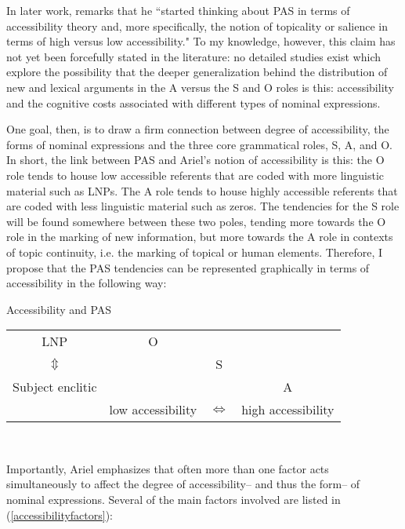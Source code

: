 In later work, \citet[194]{dubois2006} remarks that he ``started thinking about PAS in terms of accessibility theory and, more specifically, the notion of topicality or salience in terms of high versus low accessibility." To my knowledge, however, this claim has not yet been forcefully stated in the literature: no detailed studies exist which explore the possibility that the deeper generalization behind the distribution of new and lexical arguments in the A versus the S and O roles is this: accessibility and the cognitive costs associated with different types of nominal expressions.

One goal, then, is to draw a firm connection between degree of accessibility, the forms of nominal expressions and the three core grammatical roles, S, A, and O. In short, the link between PAS and Ariel's notion of accessibility is this: the O role tends to house low accessible referents that are coded with more linguistic material such as LNPs. The A role tends to house highly accessible referents that are coded with less linguistic material such as zeros. The tendencies for the S role will be found somewhere between these two poles, tending more towards the O role in the marking of new information, but more towards the A role in contexts of topic continuity, i.e. the marking of topical or human elements. Therefore, I propose that the PAS tendencies can be represented graphically in terms of accessibility in the following way: 

\ea\label{graphic} Accessibility and PAS

\begin{tabular}{ c  c  c  c } 
LNP & O &  & \\

$\Updownarrow$ &  &  S &   \\

Subject enclitic &  &  & A  \\

\midrule 
 & low accessibility  &  $\Leftrightarrow$ & high accessibility \\
 
\end{tabular}\\ 

\z

Importantly, Ariel emphasizes that often more than one factor acts simultaneously to affect the degree of accessibility-- and thus the form-- of nominal expressions. Several of the main factors involved are listed in (\ref{accessibilityfactors}): 

